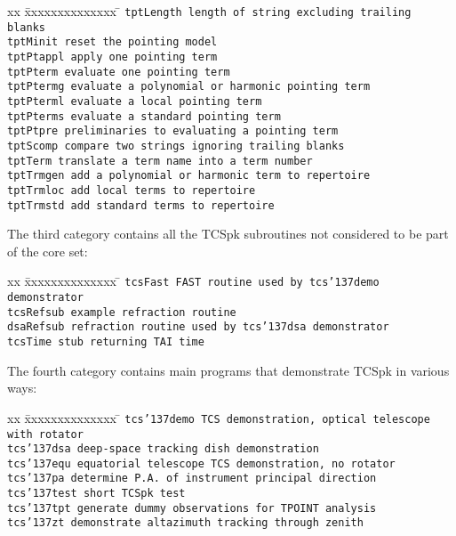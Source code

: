 \documentclass[12pt,fleqn,twoside]{article}
\renewcommand{\_}{{\tt\char'137}}     %
\begin{document}
\begin{tabbing}
xx \= xxxxxxxxxxxxxx \= \kill
\> \tt tptLength \> length of string excluding trailing blanks \\
\> \tt tptMinit  \> reset the pointing model \\
\> \tt tptPtappl \> apply one pointing term \\
\> \tt tptPterm  \> evaluate one pointing term \\
\> \tt tptPtermg \> evaluate a polynomial or harmonic pointing term \\
\> \tt tptPterml \> evaluate a local pointing term \\
\> \tt tptPterms \> evaluate a standard pointing term \\
\> \tt tptPtpre  \> preliminaries to evaluating a pointing term \\
\> \tt tptScomp  \> compare two strings ignoring trailing blanks \\
\> \tt tptTerm   \> translate a term name into a term number \\
\> \tt tptTrmgen \> add a polynomial or harmonic term to repertoire \\
\> \tt tptTrmloc \> add local terms to repertoire \\
\> \tt tptTrmstd \> add standard terms to repertoire
\end{tabbing}
\fi
The third category contains all the TCSpk subroutines not considered
to be part of the core set:
\begin{tabbing}
xx \= xxxxxxxxxxxxxx \= \kill
\> \tt tcsFast    \> FAST routine used by {\tt tcs\_demo} demonstrator \\
\> \tt tcsRefsub  \> example refraction routine \\
\> \tt dsaRefsub  \> refraction routine used by {\tt tcs\_dsa}
                                                          demonstrator \\
\> \tt tcsTime    \> stub returning TAI time
\end{tabbing}
The fourth category contains main programs that demonstrate
TCSpk in various ways:
\begin{tabbing}
xx \= xxxxxxxxxxxxxx \= \kill
\> \tt tcs\_demo \> TCS demonstration, optical telescope with rotator \\
\> \tt tcs\_dsa  \> deep-space tracking dish demonstration \\
\> \tt tcs\_equ  \> equatorial telescope TCS demonstration, no rotator \\
\> \tt tcs\_pa   \> determine P.A.~of instrument principal direction \\
\> \tt tcs\_test \> short TCSpk test \\
\> \tt tcs\_tpt  \> generate dummy observations for TPOINT analysis \\
\> \tt tcs\_zt   \> demonstrate altazimuth tracking through zenith \\
\end{tabbing}
\end{document}
